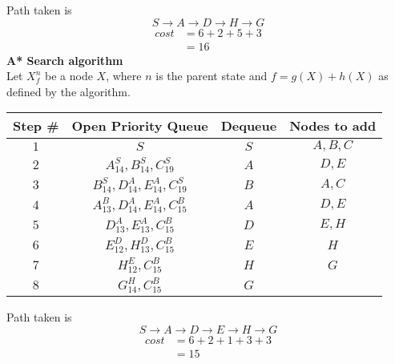 \begin{enumerate}
\begin{center}
\begin{tabular}{|c|c|c|c|}
            \hline
          \end{tabular}
          \egroup
        \end{center}
        Path taken is
        $$
          S \rightarrow A \rightarrow D \rightarrow H \rightarrow G
        $$
        \begin{align*}
          cost & = 6 + 2 + 5 + 3 \\
               & = 16
        \end{align*}
        \textbf{A* Search algorithm}\\
        Let $X^n_f$ be a node $X$, where $n$ is the parent state and $f=g(X) + h(X)$ as defined by the algorithm.
        \begin{center}
          \bgroup
          \def\arraystretch{1.5}%
          \captionsetup{type=figure}
          \begin{tabular}{|c|c|c|c|}
            \hline
            Step \# & Open Priority Queue                      & Dequeue & Nodes to add \\
            \hline
            $1$     & $S$                                      & $S$     & $A,B,C$      \\
            $2$     & $A^S_{14}, B^S_{14}, C^S_{19}$           & $A$     & $D,E$        \\
            $3$     & $B^S_{14}, D^A_{14}, E^A_{14}, C^S_{19}$ & $B$     & $A,C$        \\
            $4$     & $A^B_{13}, D^A_{14}, E^A_{14}, C^B_{15}$ & $A$     & $D,E$        \\
            $5$     & $D^A_{13}, E^A_{13}, C^B_{15}$           & $D$     & $E,H$        \\
            $6$     & $E^D_{12}, H^D_{13}, C^B_{15}$           & $E$     & $H$          \\
            $7$     & $H^E_{12}, C^B_{15}$                     & $H$     & $G$          \\
            $8$     & $G^H_{14}, C^B_{15}$                     & $G$     &              \\
            \hline
          \end{tabular}
          \egroup
        \end{center}
        Path taken is
        $$
          S \rightarrow A \rightarrow D \rightarrow E \rightarrow H \rightarrow G
        $$
        \begin{align*}
          cost & = 6 + 2 + 1 + 3 + 3 \\
               & = 15
        \end{align*}
\end{enumerate}